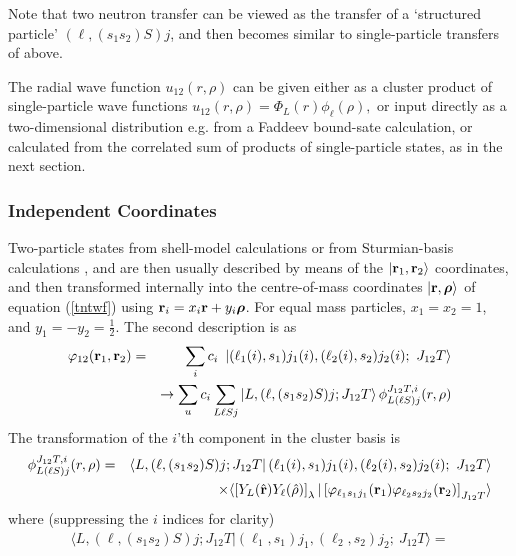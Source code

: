 \documentclass[11pt,a4paper]{article}
\newcommand{\vecr}{{\bf r}}
\newcommand{\brho}{{\mbox{\boldmath $\rho$}}}
\newcommand{\half}{\frac{1}{2}}
\begin{document}
Note that two neutron transfer can be viewed as the transfer of a
`structured particle'
$  ( \ell , (s_1 s_2) S ) j  $, and then becomes similar to single-particle transfers of above.

The radial wave function $u_{12} (r, \rho) $
can be given either as a cluster product of single-particle wave functions
$ u_{12} (r, \rho)  =\Phi_L (r)\phi_\ell (\rho), $
or input directly as a two-dimensional distribution e.g. from a Faddeev bound-sate
calculation, or calculated from the
correlated sum of products of single-particle states, as in the next section.
\subsubsection{Independent Coordinates}

Two-particle states from shell-model calculations or from Sturmian-basis
calculations \cite{vaag79}, and are then usually described by means of the
$ | \vecr_1 , \vecr_2\rangle $
coordinates, and then transformed internally into the centre-of-mass coordinates
$ | \vecr ,  {\brho} \rangle $ of equation (\ref{tntwf})
using $ \vecr_i = x_i \vecr + y_i {\brho} $.
For equal mass particles, $x_1 = x_2 = 1 $, and
$y_1 = - y_2 =\half $.
The second description is as
\begin{eqnarray}
  \varphi_{12} ( \vecr_1 , \vecr_2 ) &=&
   \sum _ i c_i ~
   \left | ( \ell_1 (i), s_1 )j_1 (i),
            ( \ell_2 (i), s_2 )j_2 (i);~ J_{12} T \right\rangle
 \\
& &\rightarrow %
  \sum _ u {c_i} \sum_{ L \ell S j}
   \left | L , ( \ell , (s_1 s_2 )S )j ;
                         J_{12} T \right\rangle
 \phi^{J_{12} T,i}_{L(\ell S)j} (r, \rho)
\end{eqnarray}
The transformation of the $i$'th component in the cluster basis is
\begin{eqnarray}
\phi^{J_{12} T,i}_{L(\ell S)j} (r, \rho) &=&
  \left\langle L , ( \ell , (s_1 s_2 )S )j ;J_{12} T \right |
  \left ( \ell_1 (i), s_1 )j_1 (i),
       ( \ell_2 (i), s_2 )j_2 (i);~ J_{12} T \right\rangle
\\
&& \times\langle
   \left [  Y_L (\hat \vecr) Y_\ell (\hat \rho) \right ] _ \lambda
    |
   \left [ \varphi_{\ell_1 s_1 j_1} (\vecr_1)\varphi_{\ell_2 s_2 j_2} (\vecr_2)
   \right ] _ {J_{12} T}  \rangle
\end{eqnarray}
where (suppressing the $i$ indices for clarity)
\begin{eqnarray} \nonumber
\langle L , ( \ell , (s_1 s_2 )S )j ;J_{12} T |
       ( \ell_1 , s_1 )j_1 ,
       ( \ell_2 , s_2 )j_2 ;~ J_{12} T\rangle =
\end{eqnarray}
\end{document}
